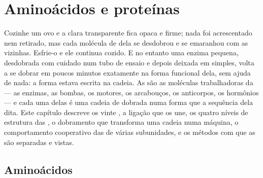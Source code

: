 \chapter{Aminoácidos e proteínas}\label{ch:b1:proteins}

Cozinhe um ovo e a clara transparente fica opaca e firme; nada foi
acrescentado nem retirado, mas cada molécula de  dela se
desdobrou e se emaranhou com as vizinhas. Esfrie-o e ele continua
cozido. E no entanto uma enzima pequena, desdobrada com cuidado num tubo
de ensaio e depois deixada em  simples, volta a se dobrar em
poucos minutos exatamente na forma funcional dela, sem ajuda de nada: a
forma estava escrita na cadeia. As  são as moléculas
trabalhadoras da  --- as enzimas, as bombas, os motores, os
arcabouços, os anticorpos, os hormônios --- e cada uma delas é uma
cadeia de  dobrada numa forma que a sequência dela dita. Este
capítulo descreve os vinte , a ligação que os une, os quatro
níveis de estrutura das , o dobramento que transforma uma
cadeia numa máquina, o comportamento cooperativo das  de várias
subunidades, e os métodos com que as  são separadas e vistas.

\section{Aminoácidos}


